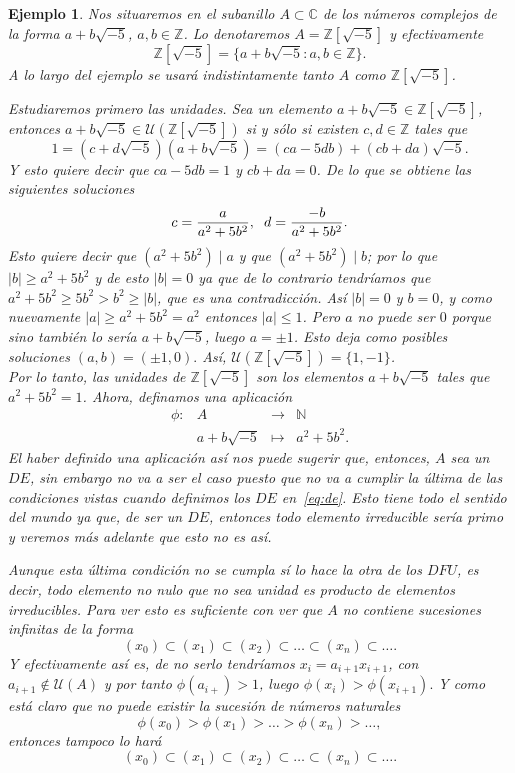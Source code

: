 \documentclass[12pt]{article}
\newtheorem{example}{Ejemplo}[theorem]
\begin{document}
\begin{example} Nos situaremos en el subanillo $A \subset \mathbb{C}$ de los números complejos de la forma $a +b\sqrt{-5}$, $a,b \in \mathbb{Z}$. Lo denotaremos $A = \mathbb{Z}[\sqrt{-5}]$ y efectivamente $$\mathbb{Z}[\sqrt{-5}] = \lbrace a + b\sqrt{-5} : a,b \in \mathbb{Z} \rbrace.$$ A lo largo del ejemplo se usará indistintamente tanto $A$ como $\mathbb{Z}[\sqrt{-5}]$. 

 Estudiaremos primero las unidades. Sea un elemento $a +b\sqrt{-5} \in \mathbb{Z}[\sqrt{-5}]$, entonces $a +b\sqrt{-5} \in \mathcal{U}(\mathbb{Z}[\sqrt{-5}])$ si y sólo si existen $c,d \in \mathbb{Z}$ tales que $$1 = (c + d\sqrt{-5})(a +b\sqrt{-5}) = (ca-5db) + (cb + da)\sqrt{-5}.$$ Y esto quiere decir que $ca-5db = 1$ y $cb + da = 0$. De lo que se obtiene las siguientes soluciones $$c = \dfrac{a}{a^{2}+5b^{2}}, \hspace{0.2cm} d = \dfrac{-b}{a^{2}+5b^{2}}.$$ Esto quiere decir que $(a^{2}+5b^{2}) \mid a$ y que $(a^{2} + 5b^{2}) \mid b$; por lo que $|b| \geq a^{2}+5b^{2}$ y de esto $|b| = 0$ ya que de lo contrario tendríamos que $a^{2} + 5b^{2} \geq 5b^{2} > b^{2} \geq |b|$, que es una contradicción. Así $|b| = 0$ y $b = 0$, y como nuevamente $|a| \geq a^{2} + 5b^{2} = a^{2}$ entonces $|a| \leq 1$. Pero $a$ no puede ser $0$ porque sino también lo sería $a + b\sqrt{-5}$, luego $a = \pm 1$. Esto deja como posibles soluciones $(a,b) = (\pm 1, 0).$ Así, $\mathcal{U} (\mathbb{Z}[\sqrt{-5}]) = \lbrace 1, -1 \rbrace$.\vspace{0.3cm}\\
 
Por lo tanto, las unidades de $\mathbb{Z}[\sqrt{-5}]$ son los elementos $a + b\sqrt{-5}$ tales que $a^{2} + 5b^{2} = 1$. Ahora, definamos una aplicación $$\begin{array}{rccl}
\phi \colon &A&\longrightarrow &\mathbb{N} \\
&a+b\sqrt{-5}& \longmapsto &a^{2}+ 5b^{2}.
\end{array}
$$ El haber definido una aplicación así nos puede sugerir que, entonces, $A$ sea un $DE$, sin embargo no va a ser el caso puesto que no va a cumplir la última de las condiciones vistas cuando definimos los $DE$ en~\ref{eq:de}. Esto tiene todo el sentido del mundo ya que, de ser un $DE$, entonces todo elemento irreducible sería primo y veremos más adelante que esto no es así.

Aunque esta última condición no se cumpla sí lo hace la otra de los $DFU$, es decir, todo elemento no nulo que no sea unidad es producto de elementos irreducibles. Para ver esto es suficiente con ver que $A$ no contiene sucesiones infinitas de la forma $$(x_{0}) \subset (x_{1}) \subset (x_{2}) \subset \ldots \subset (x_{n}) \subset \ldots.$$ Y efectivamente así es, de no serlo tendríamos $x_{i} = a_{i+1}x_{i+1}$, con $a_{i+1} \notin  \mathcal{U}(A)$ y por tanto $\phi (a_{i+}) > 1$, luego $\phi (x_{i}) > \phi (x_{i+1}).$ Y como está claro que no puede existir la sucesión de números naturales $$\phi(x_{0}) > \phi (x_{1}) > \ldots > \phi(x_{n}) > \ldots, $$ entonces tampoco lo hará $$(x_{0}) \subset (x_{1}) \subset (x_{2}) \subset \ldots \subset (x_{n}) \subset \ldots.$$ 


\end{example}
\end{document}
